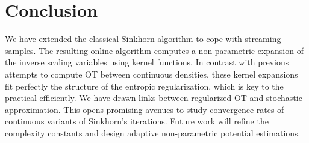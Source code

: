 
\section{Conclusion}

We have extended the classical Sinkhorn algorithm to cope with streaming samples. The resulting online algorithm computes a non-parametric expansion of the inverse scaling variables using kernel functions. In contrast with previous attempts to compute OT between continuous densities, these kernel expansions fit perfectly the structure of the entropic regularization, which is key to the practical efficiently.
%
We have drawn links between regularized OT and stochastic approximation. This opens promising avenues to study convergence rates of continuous variants of Sinkhorn's iterations. Future work will refine the complexity constants and design adaptive non-parametric potential estimations.